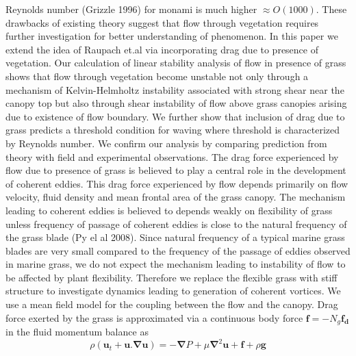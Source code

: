 \documentclass[aps,twocolumn,floatfix,prl,10pt]{revtex4-1}
\newcommand{\bu}{\mathbf{u}}
\newcommand{\grad}{\mathbf{\nabla}}
\begin{document}
Reynolds number (Grizzle 1996) for monami is much higher $\approx O(1000)$. These drawbacks of existing theory suggest that flow through vegetation requires 
further investigation for better understanding of phenomenon.
\newline 
In this paper we extend the idea of Raupach et.al via incorporating drag due to presence of vegetation. Our calculation of linear stability analysis of flow in presence of grass
shows that flow through vegetation become unstable not only through a mechanism of Kelvin-Helmholtz 
instability associated with strong shear near the canopy top but also through shear instability of flow above grass canopies arising due to existence of flow boundary.
We further show that inclusion of drag due to grass predicts a threshold condition for waving where 
threshold is characterized by Reynolds number. We confirm our analysis by comparing prediction from theory with field and experimental observations.
\newline  
The drag force experienced by flow due to presence of grass is believed to play a central role in the development of coherent eddies. This drag force experienced by flow depends 
primarily on flow velocity, fluid density and mean frontal area of the grass canopy. The mechanism leading to coherent eddies is believed to depends weakly on flexibility of grass
unless frequency of passage of coherent eddies is close to the natural frequency of the grass blade (Py el al 2008). Since natural frequency of a typical marine grass blades are
very small compared to the frequency of the passage of eddies observed in marine grass, we do not expect the mechanism leading to instability of flow to be affected by plant flexibility.
Therefore we replace the flexible grass with stiff structure to investigate dynamics leading to generation of coherent vortices. We use a mean field model for the coupling between the flow and the canopy. Drag force exerted by the grass is approximated via a 
continuous body force $\mathbf{f}=-N_g\mathbf{f_d}$ in the fluid momentum balance as
\begin{equation}
\rho \left(\bu_{t}+\bu.\grad\bu \right) = -\grad P+\mu\grad^{2}\bu +\mathbf{f}+\rho\mathbf{g}
\label{navier-stokes}
\end{equation}
\end{document}
